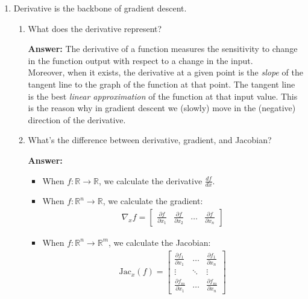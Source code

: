 \documentclass{article}
\newenvironment{QandA}{\begin{enumerate}[label=\arabic*.]}{\end{enumerate}}
\newenvironment{InnerQandA}{\begin{enumerate}[label=\roman*.]}{\end{enumerate}}
\newenvironment{answer}{\par\normalfont \textbf{Answer:}}{}
\newcommand{\R}{\mathbb{R}}
\newcommand{\Jac}{\text{Jac}}
\begin{document}
\begin{QandA}
    \item Derivative is the backbone of gradient descent.
    \begin{InnerQandA}
        \item What does the derivative represent?
        \begin{answer}
            The derivative of a function measures the sensitivity to change in the function output with respect to a change in the input. \\
            Moreover, when it exists, the derivative at a given point is the \textit{slope} of the tangent line to the graph of the function at that point. The tangent line is the best \textit{linear approximation} of the function at that input value. This is the reason why in gradient descent we (slowly) move in the (negative) direction of the derivative. 
        \end{answer}
        \item What’s the difference between derivative, gradient, and Jacobian?
        \begin{answer}
            \begin{itemize}
                \item When $f: \R \rightarrow \R$, we calculate the derivative $\frac{df}{dx}$.
                \item When $f: \R^n \rightarrow \R$, we calculate the gradient:
                \begin{align*}
                    \nabla_x f = 
                    \begin{bmatrix}
                     \frac{\partial f}{ \partial x_1} & \frac{\partial f}{ \partial x_2} & \ldots  & \frac{\partial f}{ \partial x_n}
                    \end{bmatrix}
                \end{align*}
                \item When $f: \R^n \rightarrow \R^m$, we calculate the Jacobian:
                \begin{align*}
                    \Jac_x(f) = 
                    \begin{bmatrix}
                     \frac{\partial f_1}{ \partial x_1} & \ldots & \frac{\partial f_1}{ \partial x_n} \\
                     \vdots & \ddots & \vdots \\
                     \frac{\partial f_m}{ \partial x_1} & \ldots & \frac{\partial f_m}{ \partial x_n}
                    \end{bmatrix}
                \end{align*}
            \end{itemize}
        \end{answer}
    \end{InnerQandA}
    

\end{QandA}
\end{document}
